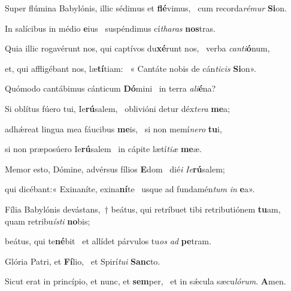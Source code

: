 \item Super flúmina Babylónis, illic sédimus et \textbf{flé}vimus,~\psstar{} cum recorda\textit{rémur} \textbf{Si}on.

\item In salícibus in médio \textbf{e}ius~\psstar{} suspéndimus cí\textit{tharas} \textbf{nos}tras.

\item Quia illic rogavérunt nos, qui captívos du\textbf{xé}runt nos,~\psstar{} verba \textit{canti}\textbf{ó}num,

\item et, qui affligébant nos, læ\textbf{tí}tiam:~\psstar{} « Cantáte nobis de cán\textit{ticis} \textbf{Si}on».

\item Quómodo cantábimus cánticum \textbf{Dó}mini~\psstar{} in terra \textit{ali}\textbf{é}na?

\item Si oblítus fúero tui, Ie\textbf{rú}salem,~\psstar{} oblivióni detur déx\textit{tera} \textbf{me}a;

\item adhǽreat lingua mea fáucibus \textbf{me}is,~\psstar{} si non memí\textit{nero} \textbf{tu}i,

\item si non præposúero Ie\textbf{rú}salem~\psstar{} in cápite lætí\textit{tiæ} \textbf{me}æ.

\item Memor esto, Dómine, advérsus fílios \textbf{E}dom~\psstar{} dié\textit{i} \textit{Ie}\textbf{rú}salem;

\item qui dicébant:« Exinaníte, exina\textbf{ní}te~\psstar{} usque ad fundamén\textit{tum} \textit{in} \textbf{e}a».

\item Fília Babylónis devástans,~† beátus, qui retríbuet tibi retributiónem \textbf{tu}am,~\psstar{} quam retribu\textit{ísti} \textbf{no}bis;

\item beátus, qui te\textbf{né}bit~\psstar{} et allídet párvulos tu\textit{os} \textit{ad} \textbf{pe}tram.

\item Glória Patri, et \textbf{Fí}lio,~\psstar{} et Spirí\textit{tui} \textbf{Sanc}to.

\item Sicut erat in princípio, et nunc, et \textbf{sem}per,~\psstar{} et in sǽcula sæcu\textit{lórum}. \textbf{A}men.